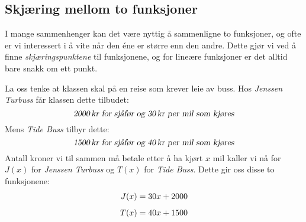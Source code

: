 \subsection{Skjæring mellom to funksjoner} 
I mange sammenhenger kan det være nyttig å sammenligne to funksjoner, og ofte er vi interessert i å vite når den éne er større enn den andre. Dette gjør vi ved å finne \textit{skjæringspunktene} til funksjonene, og for lineære funksjoner er det alltid bare snakk om ett punkt.\vsk

La oss tenke at klassen skal på en reise som krever leie av buss. Hos \textit{Jenssen Turbuss} får klassen dette tilbudet:
\[ \textsl{2000\,kr for sjåfør og 30\,kr per mil som kjøres} \]
Mens \textit{Tide Buss} tilbyr dette:
\[ \textsl{1500\,kr for sjåfør og 40\,kr per mil som kjøres} \]
Antall kroner vi til sammen må betale etter å ha kjørt $ x $ mil kaller vi nå for $ J(x) $ for \textit{Jenssen Turbuss} og $ T(x) $ for \textit{Tide Buss}. Dette gir oss disse to funksjonene:
\begin{align}
	J(x) &= 30x + 2000 \label{J}\br 
	T(x) &= 40x + 1500 \label{T}
\end{align}


